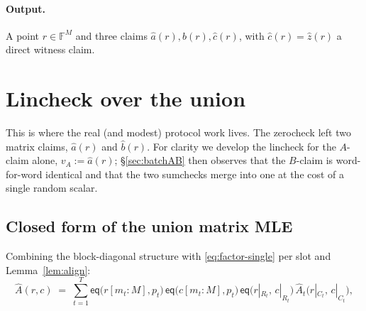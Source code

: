 \documentclass[11pt]{article}
\newcommand{\F}{\mathbb{F}}                       %
\newcommand{\eq}{\mathsf{eq}}
\theoremstyle{definition}
\begin{document}
\paragraph{Output.} A point $r \in \F^{M}$ and three claims
$\hat a(r), \hat b(r), \hat c(r)$, with $\hat c(r) = \hat z(r)$ a direct
witness claim.

\section{Lincheck over the union}\label{sec:lc}

This is where the real (and modest) protocol work lives. The zerocheck left
two matrix claims, $\hat a(r)$ and $\hat b(r)$. For clarity we develop the
lincheck for the $A$-claim alone, $v_A := \hat a(r)$;
\S\ref{sec:batchAB} then observes that the $B$-claim is word-for-word
identical and that the two sumchecks merge into one at the cost of a single
random scalar.

\subsection{Closed form of the union matrix MLE}

Combining the block-diagonal structure with
\eqref{eq:factor-single} per slot and Lemma~\ref{lem:align}:
\begin{equation}\label{eq:factor-union}
  \hat A(r, c) \;=\; \sum_{t=1}^{T}
     \eq\bigl(r[m_t{:}M], p_t\bigr)\,
     \eq\bigl(c[m_t{:}M], p_t\bigr)\,
     \eq\bigl(r|_{R_t},\, c|_{R_t}\bigr)\,
     \hat A_t\bigl(r|_{C_t},\, c|_{C_t}\bigr),
\end{equation}
\end{document}

